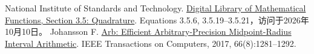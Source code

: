  National Institute of Standards and Technology. \href{https://dlmf.nist.gov/3.5}{Digital Library of Mathematical Functions, Section 3.5: Quadrature}. Equations 3.5.6, 3.5.19--3.5.21，访问于2026年10月10日。
 Johansson F. \href{https://doi.org/10.1109/TC.2017.2690633}{Arb: Efficient Arbitrary-Precision Midpoint-Radius Interval Arithmetic}. IEEE Transactions on Computers, 2017, 66(8):1281--1292.
